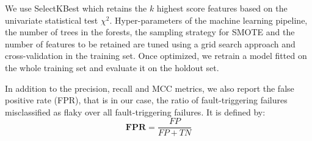 We use SelectKBest\cite{selectkbest} which retains the $k$ highest score features based on the univariate statistical test $\chi^2$.
Hyper-parameters of the machine learning pipeline, \ie the number of trees in the forests, the sampling strategy for SMOTE and the number of features to be retained are tuned using a grid search approach and cross-validation in the training set. Once optimized, we retrain a model fitted on the whole training set and evaluate it on the holdout set.

In addition to the precision, recall and MCC metrics, we also report the false positive rate (FPR), that is in our case, the ratio of fault-triggering failures misclassified as flaky over all fault-triggering failures. It is defined by:
    \[
    \textbf{FPR} = \frac{FP}{FP+TN}
    \]